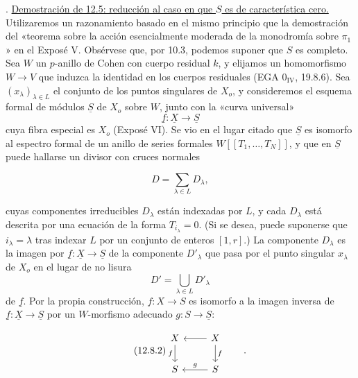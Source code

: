 
\medskip
{}. \underline{Demostración de 12.5: reducción al caso en que $S$ es
de característica cero.} Utilizaremos un razonamiento basado en el mismo
principio que la demostración del «teorema sobre la acción esencialmente
moderada de la monodromía sobre $\pi_1$» en el Exposé
V\sisi{\hspace{4em}}{}. Obsérvese que, por 10.3, podemos suponer que $S$
es completo. Sea $W$ un $p$-anillo de Cohen con cuerpo residual $k$, y
elijamos un homomorfismo $W\longrightarrow V$ que induzca la identidad
en los cuerpos residuales (EGA $0_{\mathrm{IV}}$, 19.8.6). Sea
$(x_\lambda)_{\lambda\in L}$ el conjunto de los puntos singulares de
$X_o$, y consideremos el esquema formal de módulos $\underline S$ de
$X_o$ sobre $W$, junto con la «curva universal»
\[
 \underline f:\underline X\longrightarrow\underline S
\]
cuya fibra especial es $X_o$ (Exposé VI\sisi{\hspace{3em}}{}). Se vio en
el lugar citado que $\underline S$ es isomorfo al espectro formal de un
anillo de series formales $W[[T_1,\ldots,T_N]]$, y que en $\underline S$
puede hallarse un divisor con cruces normales


\begin{equation}\tag{12.8.1}
 D=\sum_{\lambda\in L}D_\lambda,
\end{equation}

\noindent
cuyas componentes irreducibles $D_\lambda$ están indexadas por $L$, y
cada $D_\lambda$ está descrita por una ecuación de la forma
$T_{i_\lambda}=0$. (Si se desea, puede suponerse que
$i_\lambda=\lambda$ tras indexar $L$ por un conjunto de enteros
$[1,r]$.) La componente $D_\lambda$ es la imagen por
$\underline f:\underline X\longrightarrow\underline S$ de la componente
$D'_\lambda$ que pasa por el punto singular $x_\lambda$ de $X_o$ en el
lugar de no lisura
\[
 D'=\bigcup_{\lambda\in L}D'_\lambda
\]
de $\underline f$. Por la propia construcción,
$f:X\longrightarrow S$ es isomorfo a la imagen inversa de
$\underline f:\underline X\longrightarrow\underline S$ por un
$W$-morfismo adecuado $g:S\longrightarrow\underline S$:

\begin{equation}\tag{12.8.2}
\begin{tikzcd}
 \underline X \arrow[d,"\underline f"'] &
 X \arrow[l] \arrow[d,"f"] \\
 \underline S & S \arrow[l,"g"']
\end{tikzcd}
\qquad .
\end{equation}

